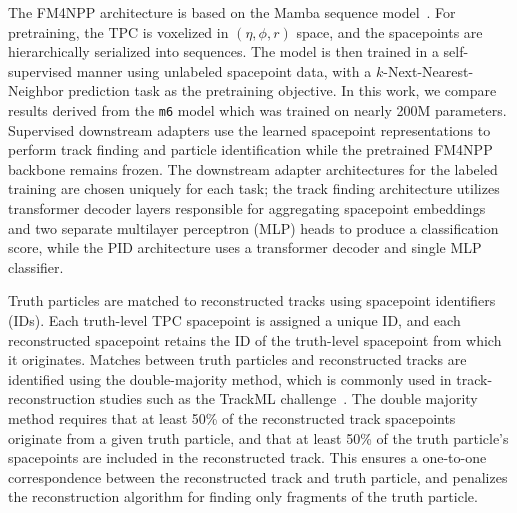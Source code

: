 \documentclass[aps,physrev,twocolumn,superscriptaddress]{revtex4-2}
\begin{document}
The FM4NPP architecture is based on the Mamba sequence model~\cite{gu2024mambalineartimesequencemodeling}. For pretraining, the TPC is voxelized in $(\eta,\phi,r)$ space, and the spacepoints are hierarchically serialized into sequences. The model is then trained in a self-supervised manner using unlabeled spacepoint data, with a $k$-Next-Nearest-Neighbor prediction task as the pretraining objective. In this work, we compare results derived from the \texttt{m6} model which was trained on nearly 200M parameters. Supervised downstream adapters use the learned spacepoint representations to perform track finding and particle identification while the pretrained FM4NPP backbone remains frozen. The downstream adapter architectures for the labeled training are chosen uniquely for each task; the track finding architecture utilizes transformer decoder layers responsible for aggregating spacepoint embeddings and two separate multilayer perceptron (MLP) heads to produce a classification score, while the PID architecture uses a transformer decoder and single MLP classifier.

Truth particles are matched to reconstructed tracks using spacepoint identifiers (IDs). Each truth-level TPC spacepoint is assigned a unique ID, and each reconstructed spacepoint retains the ID of the truth-level spacepoint from which it originates. Matches between truth particles and reconstructed tracks are identified using the double-majority method, which is commonly used in track-reconstruction studies such as the TrackML challenge~\cite{Amrouche:2019wmx,Amrouche:2021nbs}. 
The double majority method requires that at least 50\% of the reconstructed track spacepoints originate from a given truth particle, and that at least 50\% of 
the truth particle's spacepoints are included in the reconstructed track. This ensures a one-to-one correspondence between the reconstructed track and truth particle, and penalizes the reconstruction algorithm for finding only fragments of the truth particle.
\end{document}
